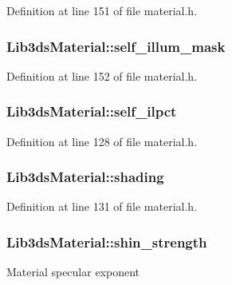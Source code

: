Definition at line 151 of file material.\-h.

\hypertarget{struct_lib3ds_material_a96ce35b6403f418862ea510d70b4a272}{
\subsubsection[{self\-\_\-illum\-\_\-mask}]{ Lib3ds\-Material\-::self\-\_\-illum\-\_\-mask}}\label{struct_lib3ds_material_a96ce35b6403f418862ea510d70b4a272}


Definition at line 152 of file material.\-h.

\hypertarget{struct_lib3ds_material_a07068226c50911e8f9951ce941756bc1}{
\subsubsection[{self\-\_\-ilpct}]{ Lib3ds\-Material\-::self\-\_\-ilpct}}\label{struct_lib3ds_material_a07068226c50911e8f9951ce941756bc1}


Definition at line 128 of file material.\-h.

\hypertarget{struct_lib3ds_material_a72ee84426d2dcd5798208674c91d7eda}{
\subsubsection[{shading}]{ Lib3ds\-Material\-::shading}}\label{struct_lib3ds_material_a72ee84426d2dcd5798208674c91d7eda}


Definition at line 131 of file material.\-h.

\hypertarget{struct_lib3ds_material_a0c0e5bd539d2014c445fd7f3876a762d}{
\subsubsection[{shin\-\_\-strength}]{ Lib3ds\-Material\-::shin\-\_\-strength}}\label{struct_lib3ds_material_a0c0e5bd539d2014c445fd7f3876a762d}
Material specular exponent 

